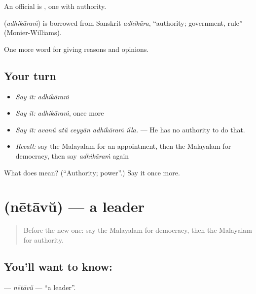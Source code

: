 An official is , one with authority.

\begin{cousinweb}
\textbf{} (\emph{adhikāraṁ}) is borrowed from Sanskrit \emph{adhikāra}, \textquotedblleft{}authority; government, rule\textquotedblright{} (Monier-Williams).
\end{cousinweb}

\begin{grammarlens}[title={What you've built}]
One more word for giving reasons and opinions.
\end{grammarlens}

\subsection*{Your turn}
\begin{itemize}
\raggedright
  \item \emph{Say it:} \emph{adhikāraṁ}
  \item \emph{Say it:} \emph{adhikāraṁ}, once more
  \item \emph{Say it:} \emph{avanŭ atŭ ceyyān adhikāraṁ illa.} — He has no authority to do that.
  \item \emph{Recall:} say the Malayalam for an appointment, then the Malayalam for democracy, then say \emph{adhikāraṁ} again
\end{itemize}

\begin{tcolorbox}[breakable,colback=teal!4,colframe=teal!35!black,title={Before you move on}]
What does  mean? (\textquotedblleft{}Authority; power\textquotedblright{}.) Say it once more.
\end{tcolorbox}
\section[\texorpdfstring{\ml{നേതാവ്} (nētāvŭ)}{നേതാവ് (nētāvŭ)}]{ (nētāvŭ) — a leader}

\label{lesson:ML-C424-netavu}



\begin{quote}
Before the new one: say the Malayalam for democracy, then the Malayalam for authority.
\end{quote}

\subsection*{You'll want to know: }
\textbf{} — \emph{nētāvŭ} — \textquotedblleft{}a leader\textquotedblright{}.

